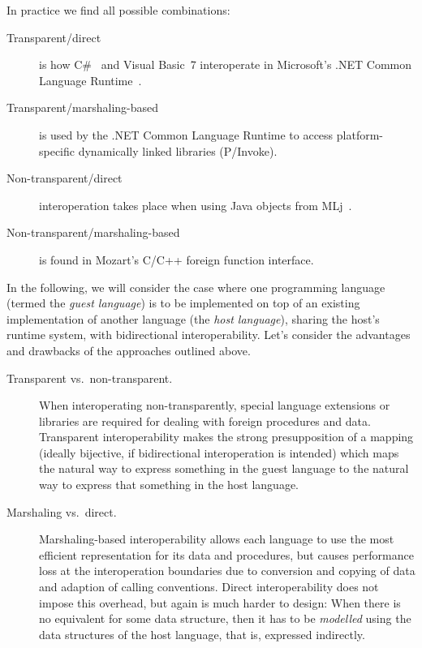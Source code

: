 \documentclass{entcs}
\begin{document}
In practice we find all possible combinations:
\begin{description}
\item[Transparent\slash direct] is how C\#~\cite{CSharp} and Visual Basic~7
  interoperate in Microsoft's .NET Common Language Runtime~\cite{DotNet}.
\item[Transparent\slash marshaling-based] is used by the .NET Common Language
  Runtime to access platform-specific dynamically linked libraries (P/Invoke).
\item[Non-transparent\slash direct] interoperation takes place when using
  Java objects from MLj~\cite{MLj}.
\item[Non-transparent\slash marshaling-based] is found in Mozart's
  C/C++ foreign function interface.
\end{description}

\noindent In the following, we will consider the case where one programming
language (termed the \emph{guest language}) is to be implemented on top of
an existing implementation of another language (the \emph{host language}),
sharing the host's runtime system, with bidirectional interoperability.
Let's consider the advantages and drawbacks of the approaches outlined above.
\begin{description}
\item[Transparent vs.\ non-transparent.]  When interoperating
  non-trans\-pa\-rent\-ly, special language extensions or libraries are
  required for dealing with foreign procedures and data.  Transparent
  interoperability makes the strong presupposition of a mapping (ideally
  bijective, if bidirectional interoperation is intended) which maps the
  natural way to express something in the guest language to the natural way
  to express that something in the host language.
\item[Marshaling vs.\ direct.]  Marshaling-based interoperability allows
  each language to use the most efficient representation for its data and
  procedures, but causes performance loss at the interoperation boundaries
  due to conversion and copying of data and adaption of calling conventions.
  Direct interoperability does not impose this overhead, but again is much
  harder to design:  When there is no equivalent for some data structure,
  then it has to be \emph{modelled} using the data structures of the host
  language, that is, expressed indirectly.
\end{description}

\end{document}

